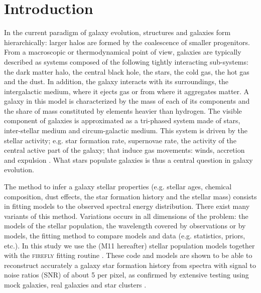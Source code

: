 \documentclass[onecolumn]{aa}
\begin{document}
\section{Introduction}
\label{sec:introduction}

In the current paradigm of galaxy evolution, structures and galaxies form hierarchically: larger halos are formed by the coalescence of smaller progenitors. 
From a macroscopic or thermodynamical point of view, galaxies are typically described as systems composed of the following tightly interacting sub-systems: the dark matter halo, the central black hole, the stars, the cold gas, the hot gas and the dust. 
In addition, the galaxy interacts with its surroundings, the intergalactic medium, where it ejects gas or from where it aggregates matter. 
A galaxy in this model is characterized by the mass of each of its components and the share of mass constituted by elements heavier than hydrogen. 
The visible component of galaxies is approximated as a tri-phased system made of stars, inter-stellar medium and circum-galactic medium. This system is driven by the stellar activity; e.g. star formation rate, supernovae rate, the activity of the central active part of the galaxy; that induce gas movements: winds, accretion and expulsion \citep{mo2010book}. What stars populate galaxies is thus a central question in galaxy evolution. 

The method to infer a galaxy stellar properties (e.g. stellar ages, chemical composition, dust effects, the star formation history and the stellar mass) consists in fitting models to the observed spectral energy distribution. 
There exist many variants of this method. 
Variations occurs in all dimensions of the problem: the models of the stellar population, the wavelength covered by observations or by models, the fitting method to compare models and data (e.g. statistics, priors, etc.). 
In this study we use the \citet{Maraston_2011} (M11 hereafter) stellar population models together with the \textsc{firefly} fitting routine \citep{Wilkinson_2015,Goddard2017MNRAS.465..688G,Goddard2017MNRAS.466.4731G,firefly2017MNRAS}.
These code and models are shown to be able to reconstruct accurately a galaxy star formation history from spectra with signal to noise ratios (SNR) of about 5 per pixel, as confirmed by extensive testing using mock galaxies, real galaxies and star clusters \citep[see, ][and Sec. \ref{subsec:firefly:performances}]{firefly2017MNRAS}. 
\end{document}
